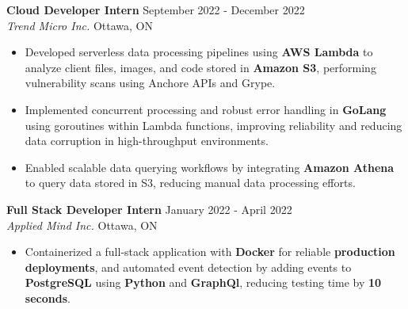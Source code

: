 \documentclass[a4paper]{article}
\begin{document}
\textbf{Cloud Developer Intern} \hfill September 2022 - December 2022\\
\textit{Trend Micro Inc.} \hfill Ottawa, ON\\
\vspace{-2mm}
\begin{itemize} \itemsep -4pt \topsep 0pt

\item Developed serverless data processing pipelines using \textbf{AWS Lambda} to analyze client files, images, and code stored in \textbf{Amazon S3}, performing vulnerability scans using Anchore APIs and Grype.

\item Implemented concurrent processing and robust error handling in \textbf{GoLang} using goroutines within Lambda functions, improving reliability and reducing data corruption in high-throughput environments.

\item Enabled scalable data querying workflows by integrating \textbf{Amazon Athena} to query data stored in S3, reducing manual data processing efforts.

\end{itemize}

\textbf{Full Stack Developer Intern} \hfill January 2022 - April 2022\\
\textit{Applied Mind Inc.} \hfill Ottawa, ON\\
\vspace{-2mm}
\begin{itemize} \itemsep -4pt \topsep 0pt
\item Containerized a full-stack application with \textbf{Docker} for reliable \textbf{production deployments}, and automated event detection by adding events to \textbf{PostgreSQL} using \textbf{Python} and \textbf{GraphQl}, reducing testing time by \textbf{10 seconds}.
\end{itemize}

\vspace{5mm}
\end{document}

